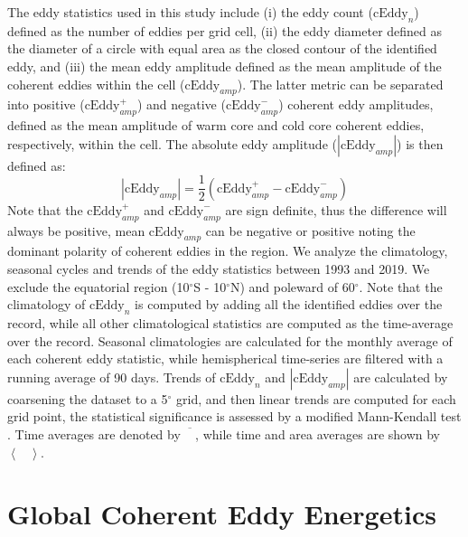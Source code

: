 \documentclass[draft,linenumbers]{agujournal2019}
\begin{document}
	The eddy statistics used in this study include (i) the eddy count ($\mathrm{cEddy}_{n}$) defined as the number of eddies per grid cell, (ii) the eddy diameter defined as the diameter of a circle with equal area as the closed contour of the identified eddy, and (iii) the mean eddy amplitude defined as the mean amplitude of the coherent eddies within the cell ($\mathrm{cEddy}_{amp}$). The latter metric can be separated into positive ($\mathrm{cEddy}_{amp}^{+}$) and negative ($\mathrm{cEddy}_{amp}^{-}$) coherent eddy amplitudes, defined as the mean amplitude of warm core and cold core coherent eddies, respectively, within the cell. 
	The absolute eddy amplitude ($|\mathrm{cEddy}_{amp}|$) is then defined as:
	\begin{equation}
	|\mathrm{cEddy}_{amp}| = \frac{1}{2} \left(\mathrm{cEddy}_{amp}^{+} -  \mathrm{cEddy}_{amp}^{-} \right)
	\end{equation}
	Note that the $\mathrm{cEddy}_{amp}^{+}$ and $\mathrm{cEddy}_{amp}^{-}$ are sign definite, thus the difference will always be positive, mean $\mathrm{cEddy}_{amp}$ can be negative or positive noting the dominant polarity of coherent eddies in the region. We analyze the climatology, seasonal cycles and trends of the eddy statistics between 1993 and 2019. We exclude the equatorial region (10$^\circ$S - 10$^\circ$N) and poleward of 60$^\circ$. Note that the climatology of $\mathrm{cEddy}_{n}$ is computed by adding all the identified eddies over the record, while all other climatological statistics are computed as the time-average over the record.  Seasonal climatologies are calculated for the monthly average of each coherent eddy statistic, while hemispherical time-series are filtered with a running average of 90 days. Trends of $\mathrm{cEddy}_{n}$ and $|\mathrm{cEddy}_{amp}|$ are calculated by coarsening the dataset to a 5$^\circ$ grid, and then linear trends are computed for each grid point, the statistical significance is assessed by a modified Mann-Kendall test \citep{Sheng_MK_2004}. Time averages are denoted by $\overline{\phantom{X}}$, while time and area averages are shown by $\left< \phantom{X}\right>$.

	\section{Global Coherent Eddy Energetics}
	\label{sec:CEKE_climatology}

\end{document}
